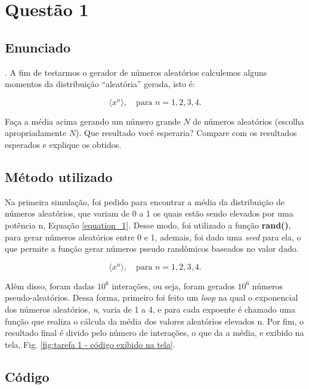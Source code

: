 \chapter*{Questão 1}

\section*{Enunciado}
. A fim de testarmos o gerador de números aleatórios calculemos alguns momentos da 
distribuição ``aleatória'' gerada, isto é:

\begin{equation}
  \langle x^n \rangle, \quad \text{para } n = 1,2,3,4.
\end{equation}

\noindent Faça a média acima gerando um número grande $N$ de números aleatórios (escolha 
apropriadamente $N$). Que resultado você esperaria? Compare com os resultados esperados 
e explique os obtidos.

\section*{Método utilizado}
Na primeira simulação, foi pedido para encontrar a média da distribuição de números aleatórios, 
que variam de 0 a 1 os quais estão sendo elevados por uma potência n, Equação \ref{equation_1}. 
Desse modo, foi utilizado a função \textbf{rand()}, para gerar números aleatórios entre 0 e 1, ademais, 
foi dado uma \textit{seed} para ela, o que permite a função gerar números pseudo randômicos baseados no valor dado.

\begin{equation} \label{equation_1}
    \langle x^n \rangle, \quad \text{para } n = 1,2,3,4.
\end{equation}

Além disso, foram dadas $10^6$ interações, ou seja, foram gerados $10^6$ números pseudo-aleatórios. 
Dessa forma, primeiro foi feito um \textit{loop} na qual o exponencial dos números aleatórios, \textit{n}, varia de 1 a 4, 
e para cada expoente é chamado uma função que realiza o cálcula da média dos valores aleatórios elevados n. 
Por fim, o resultado final é divido pelo número de interações, o que da a média, e exibido na tela, Fig. \ref{fig:tarefa 1 - código exibido na tela}.

\section*{Código}

